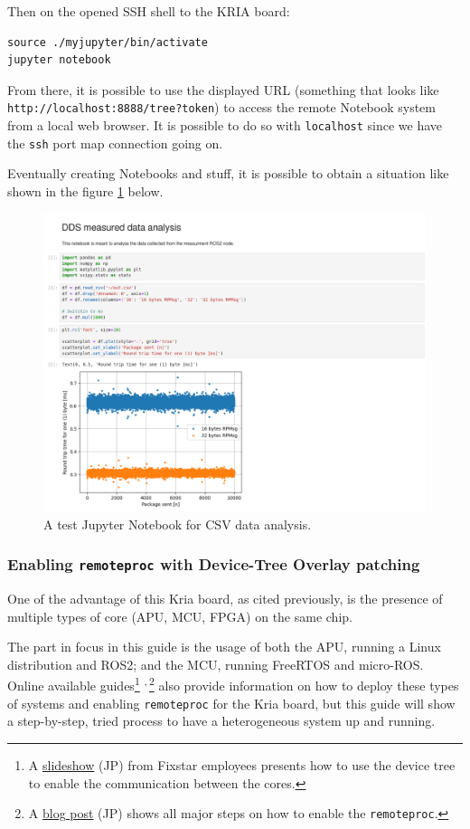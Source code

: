 \documentclass[10pt]{article}
\begin{document}
Then on the opened SSH shell to the KRIA board:
\begin{verbatim}
source ./myjupyter/bin/activate
jupyter notebook
\end{verbatim}

From there, it is possible to use the displayed URL (something that looks like
\texttt{http://localhost:8888/tree?token}) to access the remote Notebook system from a local web browser.
It is possible to do so with \texttt{localhost} since we have the \texttt{ssh} port map connection going on.

Eventually creating Notebooks and stuff, it is possible to obtain a situation like shown in the figure \ref{fig:org335b911} below.

\begin{figure}[htbp]
\centering
\includegraphics[width=.6\textwidth]{./img/jupyter.png}
\caption{\label{fig:org335b911}A test Jupyter Notebook for CSV data analysis.}
\end{figure}

\subsubsection{Enabling \texttt{remoteproc} with Device-Tree Overlay patching}
\label{sec:orgf65e5a4}
One of the advantage of this Kria board, as cited previously, is the presence of
multiple types of core (APU, MCU, FPGA) on the same chip.

The part in focus in this guide is the usage of both the APU, running
a Linux distribution and ROS2; and the MCU, running FreeRTOS and micro-ROS.
Online available guides\footnote{A \href{https://speakerdeck.com/fixstars/fpga-seminar-12-fixstars-corporation-20220727}{slideshow} (JP) from Fixstar employees presents how to use the device
tree to enable the communication between the cores.} \textsuperscript{,}\,\footnote{A \href{https://zenn.dev/ryuz88/articles/kv260\_setup\_memo\_ubuntu22 }{blog post} (JP) shows all major steps on how to enable the \texttt{remoteproc}.} also provide information on how to deploy these types
of systems and enabling \texttt{remoteproc} for the Kria board, but this guide
will show a step-by-step, tried process to have a heterogeneous system
up and running.
\end{document}
